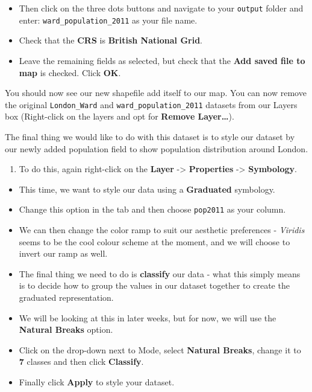 \documentclass[
]{book}
\providecommand{\tightlist}{%
  \setlength{\itemsep}{0pt}\setlength{\parskip}{0pt}}
\begin{document}
\begin{itemize}
\tightlist
\item
  Then click on the three dots buttons and navigate to your \texttt{output} folder and enter: \texttt{ward\_population\_2011} as your file name.
\item
  Check that the \textbf{CRS} is \textbf{British National Grid}.
\item
  Leave the remaining fields as selected, but check that the \textbf{Add saved file to map} is checked. Click \textbf{OK}.
\end{itemize}

You should now see our new shapefile add itself to our map. You can now remove the original \texttt{London\_Ward} and \texttt{ward\_population\_2011} datasets from our Layers box (Right-click on the layers and opt for \textbf{Remove Layer\ldots{}}).

The final thing we would like to do with this dataset is to style our dataset by our newly added population field to show population distribution around London.

\begin{enumerate}
\def\labelenumi{\arabic{enumi}.}
\setcounter{enumi}{7}
\tightlist
\item
  To do this, again right-click on the \textbf{Layer} -\textgreater{} \textbf{Properties} -\textgreater{} \textbf{Symbology}.
\end{enumerate}

\begin{itemize}
\tightlist
\item
  This time, we want to style our data using a \textbf{Graduated} symbology.
\item
  Change this option in the tab and then choose \texttt{pop2011} as your column.
\item
  We can then change the color ramp to suit our aesthetic preferences - \emph{Viridis} seems to be the cool colour scheme at the moment, and we will choose to invert our ramp as well.
\item
  The final thing we need to do is \textbf{classify} our data - what this simply means is to decide how to group the values in our dataset together to create the graduated representation.
\item
  We will be looking at this in later weeks, but for now, we will use the \textbf{Natural Breaks} option.
\item
  Click on the drop-down next to Mode, select \textbf{Natural Breaks}, change it to \textbf{7} classes and then click \textbf{Classify}.
\item
  Finally click \textbf{Apply} to style your dataset.
\end{itemize}
\end{document}
